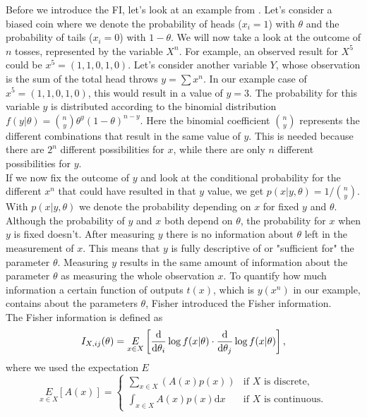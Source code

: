 Before we introduce the FI, let's look at an example from \cite{StatisticFisherInfoTutorial}. Let's consider a biased coin where we denote the probability of heads ($x_i = 1$) with $\theta$ and the probability of tails ($x_i = 0$) with $1-\theta$. We will now take a look at the outcome of $n$ tosses, represented by the variable $X^n$. For example, an observed result for $X^5$ could be $x^5 = (1,1,0,1,0)$. Let's consider another variable $Y$, whose observation is the sum of the total head throws $y = \sum x^n$. In our example case of $x^5 = (1,1,0,1,0)$, this would result in a value of $y = 3$. The probability for this variable $y$ is distributed according to the binomial distribution $f(y|\theta) = \binom{n}{y}\theta^y (1-\theta)^{n-y}$. Here the binomial coefficient $\binom{n}{y}$ represents the different combinations that result in the same value of $y$. This is needed because there are $2^n$ different possibilities for $x$, while there are only $n$ different possibilities for $y$.\\
If we now fix the outcome of $y$ and look at the conditional probability for the different $x^n$ that could have resulted in that $y$ value, we get $p(x|y,\theta) = 1/ \binom{n}{y}$. With $p(x|y,\theta)$ we denote the probability depending on $x$ for fixed $y$ and $\theta$. Although the probability of $y$ and $x$ both depend on $\theta$, the probability for $x$ when $y$ is fixed doesn't. After measuring $y$ there is no information about $\theta$ left in the measurement of $x$. This means that $y$ is fully descriptive of or "sufficient for" the parameter $\theta$. Measuring $y$ results in the same amount of information about the parameter $\theta$ as measuring the whole observation $x$. To quantify how much information a certain function of outputs $t(x)$, which is $y(x^n)$ in our example, contains about the parameters $\theta$, Fisher introduced the Fisher information.\\
The Fisher information is defined as 
\begin{equation}\label{eq:FIDefinition}
	I_{X,ij}(\theta) = \underset{x\in X}{E} \left[\frac{\mathrm{d}}{\mathrm{d}\theta_i}\log f(x|\theta) \cdot \frac{\mathrm{d}}{\mathrm{d}\theta_j}\log f(x|\theta)\right],
\end{equation}
where we used the expectation $E$
\begin{equation}
	\underset{x\in X}{E} \left[A(x)\right] = 
	\begin{cases}
		\sum_{x\in X} \left(A(x) p(x)\right) &\text{if $X$ is discrete},\\
		\int_{x\in X} A(x) p(x) \mathrm{d}x &\text{if $X$ is continuous}.
	\end{cases}
\end{equation}
